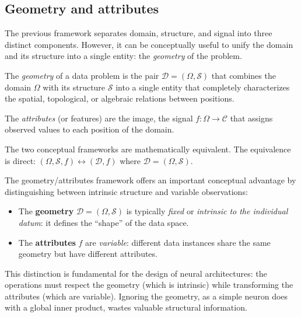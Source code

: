 \subsection{Geometry and attributes}\label{sec:geometria_atributos}

The previous framework separates domain, structure, and signal into three distinct components. However, it can be conceptually useful to unify the domain and its structure into a single entity: the \textit{geometry} of the problem.

\begin{definition}\label{def:geometria_dominio}
The \textit{geometry} of a data problem is the pair $\mathcal{D} = (\Omega, \mathcal{S})$ that combines the domain $\Omega$ with its structure $\mathcal{S}$ into a single entity that completely characterizes the spatial, topological, or algebraic relations between positions.
\end{definition}

\begin{definition}[Attributes]\label{def:atributos}
The \textit{attributes} (or features) are the image, the signal $f: \Omega \to \mathcal{C}$ that assigns observed values to each position of the domain.
\end{definition}

The two conceptual frameworks are mathematically equivalent\label{rem:equivalencia_marcos}. The equivalence is direct: $(\Omega, \mathcal{S}, f) \leftrightarrow (\mathcal{D}, f)$ where $\mathcal{D} = (\Omega, \mathcal{S})$.

The geometry/attributes framework offers an important conceptual advantage by distinguishing between intrinsic structure and variable observations:

\begin{itemize}
	\item The \textbf{geometry} $\mathcal{D} = (\Omega, \mathcal{S})$ is typically \textit{fixed} or \textit{intrinsic to the individual datum}: it defines the ``shape'' of the data space.

	\item The \textbf{attributes} $f$ are \textit{variable}: different data instances share the same geometry but have different attributes.
\end{itemize}

This distinction is fundamental for the design of neural architectures: the operations must respect the geometry (which is intrinsic) while transforming the attributes (which are variable). Ignoring the geometry, as a simple neuron does with a global inner product, wastes valuable structural information.

